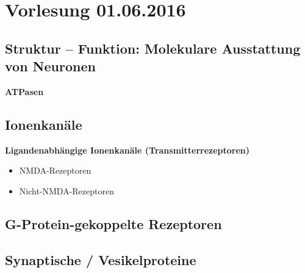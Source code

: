 \section{Vorlesung 01.06.2016}

\subsection{Struktur -- Funktion: Molekulare Ausstattung von Neuronen}

\textbf{ATPasen}

\subsection{Ionenkanäle}

\textbf{Ligandenabhängige Ionenkanäle (Transmitterrezeptoren)}

\begin{itemize}
	\item NMDA-Rezeptoren
	\item Nicht-NMDA-Rezeptoren
\end{itemize}

\subsection{G-Protein-gekoppelte Rezeptoren}

\subsection{Synaptische / Vesikelproteine}